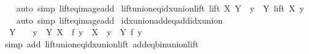 \begin{isabellebody}
%
\isadelimproof
\ \ %
\endisadelimproof
%
\isatagproof
{}\isamarkupfalse%
\ {\isacharparenleft}{\kern0pt}auto\ simp{\isacharcolon}{\kern0pt}\ lift{\isacharunderscore}{\kern0pt}eq{\isacharunderscore}{\kern0pt}image{\isacharunderscore}{\kern0pt}add{\isacharparenright}{\kern0pt}%
\endisatagproof
{\isafoldproof}%
%
\isadelimproof
\isanewline
%
\endisadelimproof
\isanewline
{}\isamarkupfalse%
\ lift{\isacharunderscore}{\kern0pt}union{\isacharunderscore}{\kern0pt}eq{\isacharunderscore}{\kern0pt}idx{\isacharunderscore}{\kern0pt}union{\isacharunderscore}{\kern0pt}lift{\isacharcolon}{\kern0pt}\ {\isachardoublequoteopen}lift\ X\ {\isacharparenleft}{\kern0pt}{\isasymUnion}Y{\isacharparenright}{\kern0pt}\ {\isacharequal}{\kern0pt}\ {\isacharparenleft}{\kern0pt}{\isasymUnion}y\ {\isasymin}\ Y{\isachardot}{\kern0pt}\ lift\ X\ y{\isacharparenright}{\kern0pt}{\isachardoublequoteclose}\isanewline
%
\isadelimproof
\ \ %
\endisadelimproof
%
\isatagproof
{}\isamarkupfalse%
\ {\isacharparenleft}{\kern0pt}auto\ simp{\isacharcolon}{\kern0pt}\ lift{\isacharunderscore}{\kern0pt}eq{\isacharunderscore}{\kern0pt}image{\isacharunderscore}{\kern0pt}add{\isacharparenright}{\kern0pt}%
\endisatagproof
{\isafoldproof}%
%
\isadelimproof
\isanewline
%
\endisadelimproof
\isanewline
{}\isamarkupfalse%
\ idx{\isacharunderscore}{\kern0pt}union{\isacharunderscore}{\kern0pt}add{\isacharunderscore}{\kern0pt}eq{\isacharunderscore}{\kern0pt}add{\isacharunderscore}{\kern0pt}idx{\isacharunderscore}{\kern0pt}union{\isacharcolon}{\kern0pt}\isanewline
\ \ {\isachardoublequoteopen}Y\ {\isasymnoteq}\ {\isacharbraceleft}{\kern0pt}{\isacharbraceright}{\kern0pt}\ {\isasymLongrightarrow}\ {\isacharparenleft}{\kern0pt}{\isasymUnion}y\ {\isasymin}\ Y{\isachardot}{\kern0pt}\ X\ {\isacharplus}{\kern0pt}\ f\ y{\isacharparenright}{\kern0pt}\ {\isacharequal}{\kern0pt}\ X\ {\isacharplus}{\kern0pt}\ {\isacharparenleft}{\kern0pt}{\isasymUnion}y\ {\isasymin}\ Y{\isachardot}{\kern0pt}\ f\ y{\isacharparenright}{\kern0pt}{\isachardoublequoteclose}\isanewline
%
\isadelimproof
\ \ %
\endisadelimproof
%
\isatagproof
{}\isamarkupfalse%
\ {\isacharparenleft}{\kern0pt}simp\ add{\isacharcolon}{\kern0pt}\ lift{\isacharunderscore}{\kern0pt}union{\isacharunderscore}{\kern0pt}eq{\isacharunderscore}{\kern0pt}idx{\isacharunderscore}{\kern0pt}union{\isacharunderscore}{\kern0pt}lift\ add{\isacharunderscore}{\kern0pt}eq{\isacharunderscore}{\kern0pt}bin{\isacharunderscore}{\kern0pt}union{\isacharunderscore}{\kern0pt}lift{\isacharparenright}{\kern0pt}%
\endisatagproof
{\isafoldproof}%

\end{isabellebody}
